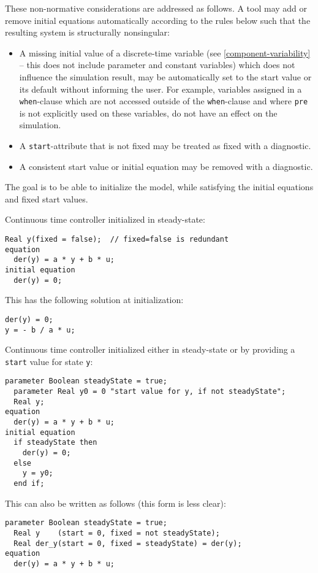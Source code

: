 These non-normative considerations are addressed as follows.
A tool may add or remove initial equations automatically according to the rules below such that the resulting system is structurally nonsingular:
\begin{itemize}
\item A missing initial value of a discrete-time variable (see \cref{component-variability} -- this does not include parameter and constant variables) which does not influence the simulation result, may be automatically set to the start value or its default without informing the user.
For example, variables assigned in a \lstinline!when!-clause which are not accessed outside of the \lstinline!when!-clause and where \lstinline!pre! is not explicitly used on these variables, do not have an effect on the simulation.
\item A \lstinline!start!-attribute that is not fixed may be treated as fixed with a diagnostic.
\item A consistent start value or initial equation may be removed with a diagnostic.
\end{itemize}

\begin{nonnormative}
The goal is to be able to initialize the model, while satisfying the initial equations and fixed start values.
\end{nonnormative}

\begin{example}
Continuous time controller initialized in steady-state:
\begin{lstlisting}[language=modelica]
  Real y(fixed = false);  // fixed=false is redundant
equation
  der(y) = a * y + b * u;
initial equation
  der(y) = 0;
\end{lstlisting}

This has the following solution at initialization:
\begin{lstlisting}[language=modelica]
der(y) = 0;
y = - b / a * u;
\end{lstlisting}
\end{example}

\begin{example}
Continuous time controller initialized either in steady-state or by providing a \lstinline!start! value for state \lstinline!y!:
\begin{lstlisting}[language=modelica]
  parameter Boolean steadyState = true;
  parameter Real y0 = 0 "start value for y, if not steadyState";
  Real y;
equation
  der(y) = a * y + b * u;
initial equation
  if steadyState then
    der(y) = 0;
  else
    y = y0;
  end if;
\end{lstlisting}

This can also be written as follows (this form is less clear):
\begin{lstlisting}[language=modelica]
  parameter Boolean steadyState = true;
  Real y    (start = 0, fixed = not steadyState);
  Real der_y(start = 0, fixed = steadyState) = der(y);
equation
  der(y) = a * y + b * u;
\end{lstlisting}
\end{example}

